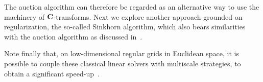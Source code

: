 The auction algorithm can therefore be regarded as an alternative way to use the machinery of $\mathrm{\textbf{C}}$-transforms. Next we explore another approach grounded on regularization, the so-called Sinkhorn algorithm, which also bears similarities with the auction algorithm as discussed in~\citep{schmitzer2016stabilized}.
%

Note finally that, on low-dimensional regular grids in Euclidean space, it is possible to couple these classical linear solvers with multiscale strategies, to obtain a significant speed-up~\citep{schmitzer2016sparse,oberman2015efficient}.




